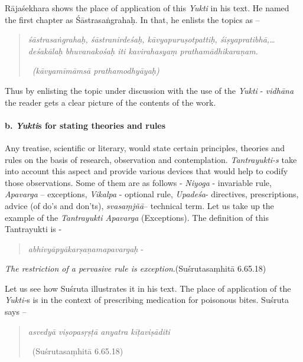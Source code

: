 Rājaśekhara shows the place of application of this \textit{Yukti} in his text. He named the first chapter as Śāstrasaṅgrahaḥ. In that, he enlists the topics as –

\begin{quote}
\textit{śāstrasaṅgrahaḥ, śāstranirdeśaḥ, kāvyapuruṣotpattiḥ, śiṣyapra\-tibhā,…deśakālaḥ bhuvanakośaḥ iti kavirahasyaṃ prathamādhi\-karaṇam.}

~\hfill \textit{(kāvyamīmāmsā prathamodhyāyaḥ)}
\end{quote}

Thus by enlisting the topic under discussion with the use of the \textit{Yukti} - \textit{vidhāna} the reader gets a clear picture of the contents of the work.


\paragraph*{b. \textit{Yukti}s for stating theories and rules}

Any treatise, scientific or literary, would state certain principles, theories and rules on the basis of research, observation and contemplation. \textit{Tantrayukti-s} take into account this aspect and provide various devices that would help to codify those observations. Some of them are as follows - \textit{Niyoga} - invariable rule, \textit{Apavarga} – exceptions, \textit{Vikalpa} - optional rule, \textit{Upadeśa}- directives, prescriptions, advice (of do’s and don’ts), \textit{svasaṃjñā}– technical term. Let us take up the example of the \textit{Tantrayukti Apavarga} (Exceptions). The definition of this Tantrayukti is -

\begin{verse}
\textit{abhivyāpyākarṣaṇamapavargaḥ} -
\end{verse}

\begin{myquote}
\textit{The restriction of a pervasive rule is exception}.\hfill (Suśrutasaṃhitā 6.65.18)
\end{myquote}

Let us see how Suśruta illustrates it in his text. The place of application of the \textit{Yukti-}s is in the context of prescribing medication for poisonous bites. Suśruta says –

\begin{verse}
\textit{asvedyā viṣopasṛṣṭā anyatra kīṭaviṣāditi}

~\hfill (Suśrutasaṃhitā 6.65.18)
\end{verse}


